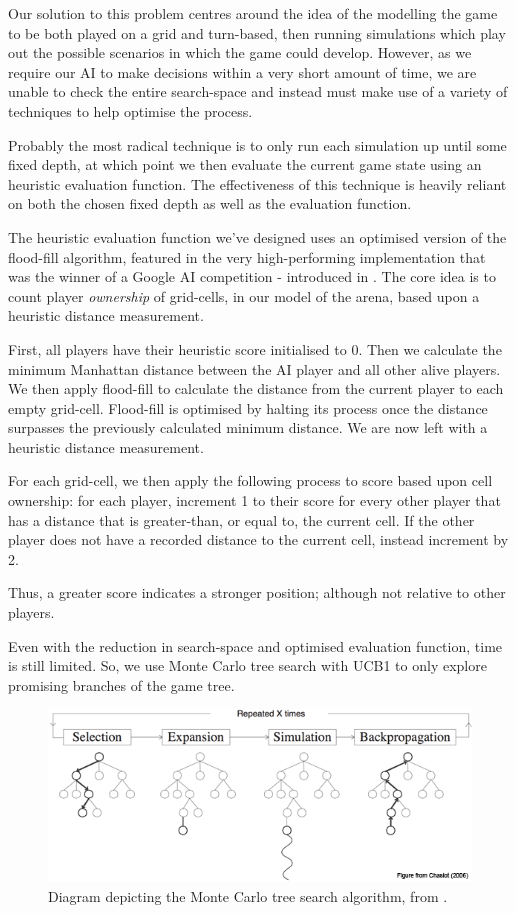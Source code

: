 \documentclass{standalone}
\begin{document}
		Our solution to this problem centres around the idea of the modelling the game to be both played on a grid and turn-based, then running simulations which play out the possible scenarios in which the game could develop. However, as we require our AI to make decisions within a very short amount of time, we are unable to check the entire search-space and instead must make use of a variety of techniques to help optimise the process.

		Probably the most radical technique is to only run each simulation up until some fixed depth, at which point we then evaluate the current game state using an heuristic evaluation function. The effectiveness of this technique is heavily reliant on both the chosen fixed depth as well as the evaluation function.

		The heuristic evaluation function we've designed uses an optimised version of the flood-fill algorithm, featured in the very high-performing implementation that was the winner of a Google AI competition - introduced in . The core idea is to count player \emph{ownership} of grid-cells, in our model of the arena, based upon a heuristic distance measurement.

		First, all players have their heuristic score initialised to 0. Then we calculate the minimum Manhattan distance between the AI player and all other alive players. We then apply flood-fill to calculate the distance from the current player to each empty grid-cell. Flood-fill is optimised by halting its process once the distance surpasses the previously calculated minimum distance. We are now left with a heuristic distance measurement.

		For each grid-cell, we then apply the following process to score based upon cell ownership: for each player, increment 1 to their score for every other player that has a distance that is greater-than, or equal to, the current cell. If the other player does not have a recorded distance to the current cell, instead increment by 2.

		Thus, a greater score indicates a stronger position; although not relative to other players.

		Even with the reduction in search-space and optimised evaluation function, time is still limited. So, we use Monte Carlo tree search \parencite{MonteCarloTreeSearch} with UCB1 to only explore promising branches of the game tree. 
		\begin{figure}[!htbp]
			\centering
			\includegraphics[width=.8\textwidth]{resources/images/mcts.png}
			\caption{Diagram depicting the Monte Carlo tree search algorithm, from \parencite{MonteCarloTreeSearchDiagram}.}
		\end{figure}
\end{document}

